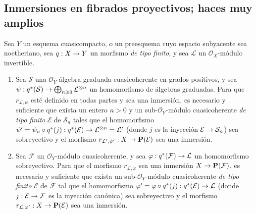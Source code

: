 \documentclass[oneside,10pt]{amsart}
\makeatletter
\renewcommand{\geq}{\geqslant}
\newcommand{\ega@arrow}[2]{\mathchoice{#1}{#2}{#2}{#2}}
\renewcommand{\to}{\ega@arrow{\longrightarrow}{\rightarrow}}
\newcommand{\oldpage}[2][]{\marginnote{\normalfont\footnotesize\textbf{#1}~|~#2}\ignorespaces}
\let\EGAOriginalLabel\label
\renewcommand{\label}[1]{\phantomsection\EGAOriginalLabel{#1}}
\makeatother
\begin{document}
\subsection{Inmersiones en fibrados proyectivos; haces muy amplios}
\label{subsection:II.4.4-fr}

\begin{proposition}[4.4.1]
\label{II.4.4.1-fr}
Sea $Y$ un esquema cuasicompacto, o un preesquema cuyo espacio subyacente sea noetheriano, sea $q:X\to Y$ un morfismo \emph{de tipo finito}, y sea $\mathcal{L}$ un $\mathcal{O}_X$-módulo invertible.
\begin{enumerate}
  \item[\rm{(i)}] Sea $\mathcal{S}$ una $\mathcal{O}_Y$-álgebra graduada cuasicoherente en grados positivos, y sea $\psi:q^*(\mathcal{S})\to\bigoplus_{n\geq0}\mathcal{L}^{\otimes n}$ un homomorfismo de álgebras graduadas.
    Para que $r_{\mathcal{L},\psi}$ esté definido en todas partes y sea una inmersión, es necesario y
\oldpage[II]{79}
    suficiente que exista un entero $n>0$ y un sub-$\mathcal{O}_Y$-módulo cuasicoherente \emph{de tipo finito} $\mathcal{E}$ de $\mathcal{S}_n$ tales que el homomorfismo $\psi'=\psi_n\circ q^*(j):q^*(\mathcal{E})
  \to\mathcal{L}^{\otimes n}=\mathcal{L}'$ (donde $j$ es la inyección $\mathcal{E}\to\mathcal{S}_n$) sea sobreyectivo y el morfismo $r_{\mathcal{L}',\psi'}:X\to\mathbf{P}(\mathcal{E})$ sea una inmersión.
  \item[\rm{(ii)}] Sea $\mathcal{F}$ un $\mathcal{O}_Y$-módulo cuasicoherente, y sea $\varphi:q^*(\mathcal{F})\to\mathcal{L}$ un homomorfismo sobreyectivo.
    Para que el morfismo $r_{\mathcal{L},\varphi}$ sea una inmersión $X\to\mathbf{P}(\mathcal{F})$, es necesario y suficiente que exista un sub-$\mathcal{O}_Y$-módulo cuasicoherente \emph{de tipo finito} $\mathcal{E}$ de $\mathcal{F}$ tal que el homomorfismo $\varphi'=\varphi\circ q^*(j):q^*(\mathcal{E})\to\mathcal{L}$ (donde $j:\mathcal{E}\to\mathcal{F}$ es la inyección canónica) sea sobreyectivo y el morfismo $r_{\mathcal{L},\varphi'}:X\to\mathbf{P}(\mathcal{E})$ sea una inmersión.
\end{enumerate}
\end{proposition}
\end{document}
